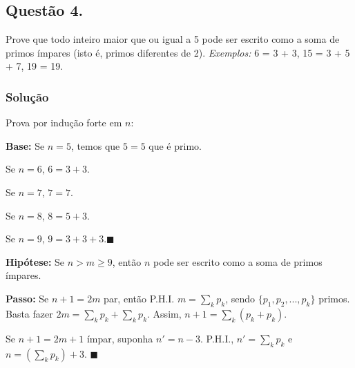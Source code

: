 \documentclass[12pt, letterpaper]{report}
\newcommand*{\CQD}{\hfill\ensuremath{\blacksquare}}%
\newcounter{ProblemNum}
\newcommand*{\anyproblem}[1]{\newpage\subsection*{#1}}
\newcommand*{\problem}[1]{\stepcounter{ProblemNum} %
   \anyproblem{Questão #1}}
\newcommand*{\soln}[1]{\subsubsection*{#1}}
\newcommand*{\solution}{\soln{Solução}}
\begin{document}
\problem{4.}
    Prove que todo inteiro maior que ou igual a 5 pode ser escrito como a soma de primos ímpares (isto é, primos diferentes de 2). \textit{Exemplos:} 6 = 3 + 3, 15 = 3 + 5 + 7, 19 = 19.

\solution
    Prova por indução forte em $n$:

    \textbf{Base:} Se $n = 5$, temos que $5 = 5$ que é primo. 

    Se $n = 6$, $6 = 3 + 3$.
    
    Se $n = 7$, $7= 7$.
    
    Se $n = 8$, $8 = 5 + 3$. 

    Se $n = 9$, $9 = 3 + 3 + 3$.\CQD

    \textbf{Hipótese:} Se $n > m \geq 9$, então $n$ pode ser escrito como a soma de primos ímpares.

    \textbf{Passo:} Se $n + 1 = 2m$ par, então P.H.I. $m = \sum_{k} p_k$, sendo $\{p_1, p_2, ..., p_k\}$ primos. Basta fazer $2m = \sum_{k} p_k + \sum_{k} p_k$. Assim, $n + 1 = \sum_{k} (p_k + p_k)$.

    Se $n + 1 = 2m + 1$ ímpar, suponha $n' = n - 3$. P.H.I., $n' = \sum_{k} p_k$ e $n = (\sum_{k} p_k) + 3$. \CQD
\end{document}
